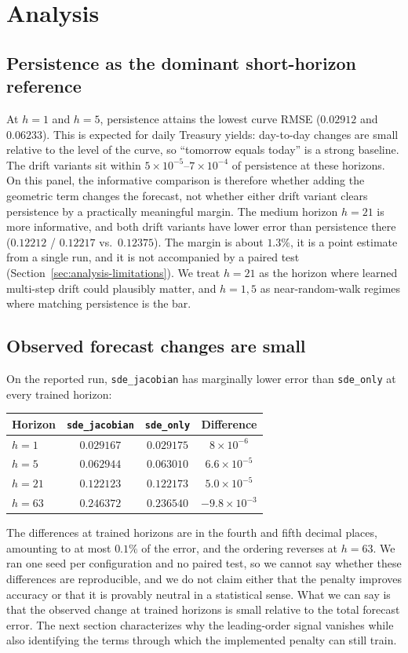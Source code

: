 \documentclass{article} %
\begin{document}
\section{Analysis}
\label{sec:analysis}
\subsection{Persistence as the dominant short-horizon reference}
\label{sec:analysis-persistence}
At $h{=}1$ and $h{=}5$, persistence attains the lowest curve RMSE ($0.02912$ and
$0.06233$). This is expected for daily Treasury yields: day-to-day changes are small
relative to the level of the curve, so ``tomorrow equals today'' is a strong
baseline. The drift variants sit within $5\times10^{-5}$--$7\times10^{-4}$ of
persistence at these horizons. On this panel, the informative comparison is
therefore whether adding the geometric term changes the forecast, not whether either
drift variant clears persistence by a practically meaningful margin.
The medium horizon $h{=}21$ is more informative, and both drift variants have lower
error than persistence there ($0.12212$ / $0.12217$ vs.\ $0.12375$). The margin is
about $1.3\%$, it is a point estimate from a single run, and it is not accompanied by
a paired test (Section~\ref{sec:analysis-limitations}). We treat $h{=}21$ as the
horizon where learned multi-step drift could plausibly matter, and $h{=}1,5$ as
near-random-walk regimes where matching persistence is the bar.
\subsection{Observed forecast changes are small}
\label{sec:analysis-jac-vs-only}
On the reported run, \texttt{sde\_jacobian} has marginally lower error than
\texttt{sde\_only} at every trained horizon:
\begin{center}
\begin{tabular}{@{}lccc@{}}
  \toprule
  Horizon & \texttt{sde\_jacobian} & \texttt{sde\_only} & Difference \\
  \midrule
  $h{=}1$  & $0.029167$ & $0.029175$ & $8\times10^{-6}$ \\
  $h{=}5$  & $0.062944$ & $0.063010$ & $6.6\times10^{-5}$ \\
  $h{=}21$ & $0.122123$ & $0.122173$ & $5.0\times10^{-5}$ \\
  $h{=}63$ & $0.246372$ & $0.236540$ & $-9.8\times10^{-3}$ \\
  \bottomrule
\end{tabular}
\end{center}
The differences at trained horizons are in the fourth and fifth decimal places,
amounting to at most $0.1\%$ of the error, and the ordering reverses at $h{=}63$. We
ran one seed per configuration and no paired test, so we cannot say whether these
differences are reproducible, and we do not claim either that the penalty improves
accuracy or that it is provably neutral in a statistical sense. What we can say is
that the observed change at trained horizons is small relative to the total forecast
error. The next section characterizes why the leading-order signal vanishes while
also identifying the terms through which the implemented penalty can still train.
\end{document}

